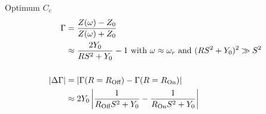 \documentclass[../main.tex]{subfiles}
\begin{document}
\begin{frame}{Optimum \(C_{c}\)}
\begin{align*}
\begin{split}
    \Gamma &= \frac{Z(\omega) - Z_{0}}{Z(\omega) + Z_{0}}\\
           &\approx \frac{2 Y_{0}}{RS^2 + Y_{0}} - 1
           \text{ with } \omega \approx \omega_{r}
           \text{ and } (RS^2 + Y_{0})^2 \gg S^2\\
           \\
    |\Delta\Gamma| &= |\Gamma(R=R_{\text{Off}}) - \Gamma(R=R_{\text{On}})|\\
                   &\approx 2Y_{0}\left|\frac{1}{
                   R_{\text{Off}} S^2 + Y_{0}} - \frac{1}{R_{\text{On}} S^2 + Y_{0}
               }\right|
\end{split}
\end{align*}
\end{frame}

%

\end{document}
